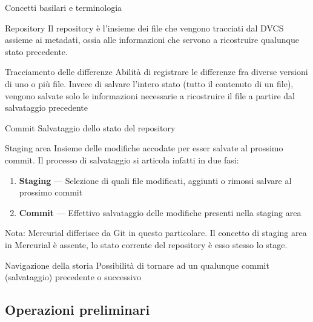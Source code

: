 \documentclass[xcolor=dvipsnames,presentation]{beamer}
\begin{document}
\begin{frame}[allowframebreaks]{Concetti basilari e terminologia}
	\begin{block}{Repository}
		Il repository è l'insieme dei file che vengono tracciati dal DVCS assieme ai metadati, ossia
alle informazioni che servono a ricostruire qualunque stato precedente.
	\end{block}
	\begin{block}{Tracciamento delle differenze}
		Abilità di registrare le differenze fra diverse versioni di uno o più file. Invece di
salvare l'intero stato (tutto il contenuto di un file), vengono salvate solo le informazioni
necessarie a ricostruire il file a partire dal salvataggio precedente
	\end{block}
	\begin{block}{Commit}
		Salvataggio dello stato del repository
	\end{block}
	\begin{block}{Staging area}
		Insieme delle modifiche accodate per esser salvate al prossimo commit. Il processo di
salvataggio si articola infatti in due fasi:
		\begin{enumerate}
			\item \textbf{Staging} --- Selezione di quali file modificati, aggiunti o rimossi
salvare al prossimo commit
			\item \textbf{Commit} --- Effettivo salvataggio delle modifiche presenti nella staging
area
		\end{enumerate}
		Nota: Mercurial differisce da Git in questo particolare. Il concetto di staging area in
Mercurial è assente, lo stato corrente del repository è esso stesso lo stage.
	\end{block}
	\begin{block}{Navigazione della storia}
		Possibilità di tornare ad un qualunque commit (salvataggio) precedente o successivo
	\end{block}
\end{frame}

\subsection{Operazioni preliminari}
\end{document}
